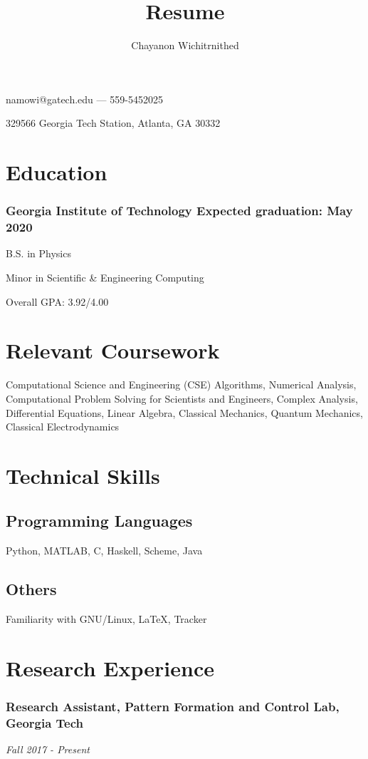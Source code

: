 \documentclass{article}
\makeatletter
\renewcommand{\maketitle}{
  \begin{center}
    {\Large\bfseries\theauthor}

    namowi@gatech.edu --- 559-5452025

    329566 Georgia Tech Station, Atlanta, GA 30332
  \end{center}
}
\makeatother
\begin{document}
\title{Resume}
\author{Chayanon Wichitrnithed}
\maketitle


\section{Education}
\subsubsection{Georgia Institute of Technology \hfill Expected graduation: May 2020}
B.S. in Physics

Minor in Scientific \& Engineering Computing

Overall GPA: 3.92/4.00

\section{Relevant Coursework}
 Computational Science and Engineering (CSE) Algorithms, Numerical Analysis, Computational Problem Solving for Scientists and Engineers, Complex Analysis, Differential Equations, Linear Algebra, Classical Mechanics, Quantum Mechanics, Classical Electrodynamics

\section{Technical Skills}
\subsection{Programming Languages}
Python, MATLAB, C, Haskell, Scheme, Java

\subsection{Others}
Familiarity with GNU/Linux, \LaTeX, Tracker

\section{Research Experience}

\subsubsection{Research Assistant, Pattern Formation and Control Lab, Georgia Tech}
\noindent
\textit{Fall 2017 - Present}
\end{document}
